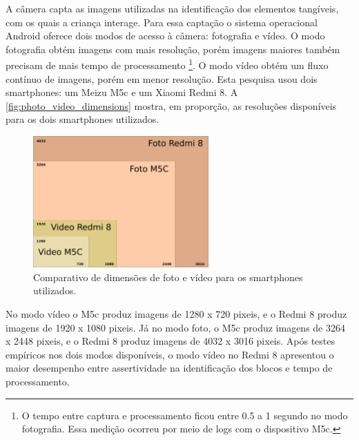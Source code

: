 A câmera capta as imagens utilizadas na identificação dos elementos tangíveis, com os quais a criança interage. Para essa captação o sistema operacional Android oferece dois modos de acesso à câmera: fotografia e vídeo. O modo fotografia obtém imagens com mais resolução, porém imagens maiores também precisam de mais tempo de processamento \footnote{O tempo entre captura e processamento ficou entre 0.5 a 1 segundo no modo fotografia. Essa medição ocorreu por meio de logs com o dispositivo M5c.}. O modo vídeo obtém um fluxo contínuo de imagens, porém em menor resolução. Esta pesquisa usou dois smartphones: um Meizu M5c e um Xiaomi Redmi 8. A \autoref{fig:photo_video_dimensions} mostra, em proporção, as resoluções disponíveis para os dois smartphones utilizados.

    

\begin{figure}[!h]
   \centering
   \includegraphics[width=0.6\textwidth,fbox]{figs/photo_video_dimensions.png}
   \caption{Comparativo de dimensões de foto e vídeo para os smartphones utilizados.}
   \label{fig:photo_video_dimensions}
\end{figure}
No modo vídeo o M5c produz imagens de 1280 x 720 pixeis, e o Redmi 8 produz imagens de 1920 x 1080 pixeis. Já no modo foto, o M5c produz imagens de 3264 x 2448 pixeis, e o Redmi 8 produz imagens de 4032 x 3016 pixeis. Após testes empíricos nos dois modos disponíveis, o modo vídeo no Redmi 8 apresentou o maior desempenho entre assertividade na identificação dos blocos e tempo de processamento.

